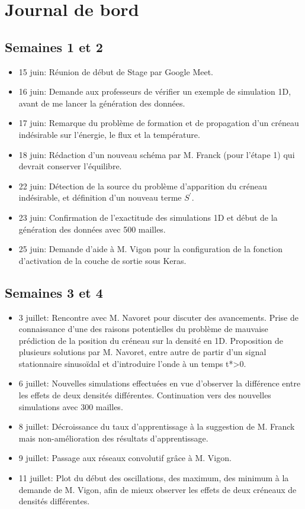 \section{Journal de bord}
\label{sec:Journal}

\subsection{Semaines 1 et 2}
\begin{itemize}
 \item 15 juin: Réunion de début de Stage par Google Meet.
 \item 16 juin: Demande aux professeurs de vérifier un exemple de simulation 1D, avant de me lancer la génération des données.
 \item 17 juin: Remarque du problème de formation et de propagation d'un créneau indésirable sur l'énergie, le flux et la température.
 \item 18 juin: Rédaction d'un nouveau schéma par M. Franck (pour l'étape 1) qui devrait conserver l'équilibre.
 \item 22 juin: Détection de la source du problème d'apparition du créneau indésirable, et définition d'un nouveau terme $S^\prime$. 
 \item 23 juin: Confirmation de l'exactitude des simulations 1D et début de la génération des données avec 500 mailles.
 \item 25 juin: Demande d'aide à M. Vigon pour la configuration de la fonction d'activation de la couche de sortie sous Keras.
\end{itemize}


\subsection{Semaines 3 et 4}

\begin{itemize}
 \item 3 juillet: Rencontre avec M. Navoret pour discuter des avancements. Prise de connaissance d'une des raisons potentielles du problème de mauvaise prédiction de la position du créneau sur la densité en 1D. Proposition de plusieurs solutions par M. Navoret, entre autre de partir d'un signal stationnaire sinusoïdal et d'introduire l'onde à un temps t*>0.
 \item 6 juillet: Nouvelles simulations effectuées en vue d'observer la différence entre les effets de deux densités différentes. Continuation vers des nouvelles simulations avec 300 mailles.
 \item 8 juillet: Décroissance du taux d'apprentissage à la suggestion de M. Franck mais non-amélioration des résultats d'apprentissage.
 \item 9 juillet: Passage aux réseaux convolutif grâce à M. Vigon.
 \item 11 juillet: Plot du début des oscillations, des maximum, des minimum à la demande de M. Vigon, afin de mieux observer les effets de deux créneaux de densités différentes. 
\end{itemize}

